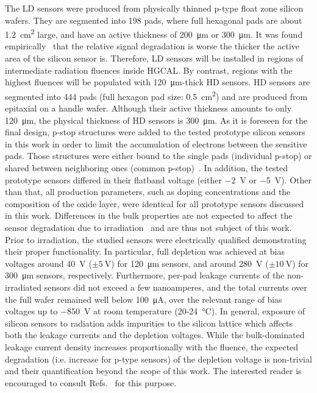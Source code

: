 The LD sensors were produced from physically thinned p-type float zone silicon wafers.
They are segmented into 198 pads, where full hexagonal pads are about \SI{1.2}{\centi\metre\squared} large, and have an active thickness of \SI{200}{\micro\meter} or \SI{300}{\micro\meter}.
It was found empirically~\cite{hgcal-tdr:2018} that the relative signal degradation is worse the thicker the active area of the silicon sensor is.
Therefore, LD sensors will be installed in regions of intermediate radiation fluences inside HGCAL.
By contrast, regions with the highest fluences will be populated with \SI{120}{\micro\meter}-thick HD sensors.
HD sensors are segmented into 444 pads (full hexagon pad size: \SI{0.5}{\centi\metre\squared}) and are produced from epitaxial on a handle wafer.
Although their active thickness amounts to only \SI{120}{\micro\meter}, the physical thickness of HD sensors is \SI{300}{\micro\metre}.\newline
As it is foreseen for the final design, p-stop structures were added to the tested prototype silicon sensors in this work in order to limit the accumulation of electrons between the sensitive pads.
Those structures were either bound to the single pads (individual p-stop) or shared between neighboring ones (common p-stop)~\cite{Brondolin_2020}.
In addition, the tested prototype sensors differed in their flatband voltage (either \SI{-2}{\volt} or \SI{-5}{\volt}).
Other than that, all production parameters, such as doping concentrations and the composition of the oxide layer, were identical for all prototype sensors discussed in this work.
Differences in the bulk properties are not expected to affect the sensor degradation due to irradiation~\cite{MOLL199987} and are thus not subject of this work.
\newline
Prior to irradiation, the studied sensors were electrically qualified demonstrating their proper functionality.
In particular, full depletion was achieved at bias voltages around \SI{40}{\volt} ($\pm\SI{5}{\volt}$) for \SI{120}{\micro\metre} sensors, and around \SI{280}{\volt} ($\pm\SI{10}{\volt}$) for \SI{300}{\micro\meter} sensors, respectively. 
Furthermore, per-pad leakage currents of the non-irradiated sensors did not exceed a few nanoamperes, and the total currents over the full wafer remained well below \SI{100}{\micro\ampere}, over the relevant range of bias voltages up to \SI{-850}{\volt} at room temperature (20-\SI{24}{\celsius}). \newline
In general, exposure of silicon sensors to radiation adds impurities to the silicon lattice which affects both the leakage currents and the depletion voltages. 
While the bulk-dominated leakage current density increases proportionally with the fluence, the expected degradation (i.e. increase for p-type sensors) of the depletion voltage is non-trivial and their quantification beyond the scope of this work.
The interested reader is encouraged to consult Refs.~\cite{moll:SiDamages,LINDSTROM200330} for this purpose.